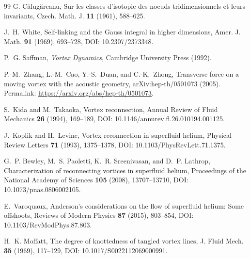 \documentclass[11pt]{article}
\theoremstyle{definition}
\theoremstyle{plain}
\theoremstyle{remark}
\begin{document}
\begin{thebibliography}{99}
            G. C\u{a}lug\u{a}reanu,
            \newblock Sur les classes d'isotopie des noeuds tridimensionnels et leurs invariants,
            \newblock Czech. Math. J. \textbf{11} (1961), 588--625.

            J.~H. White,
            \newblock Self-linking and the Gauss integral in higher dimensions,
            \newblock Amer. J. Math. \textbf{91} (1969), 693--728,
            \newblock DOI: 10.2307/2373348.

            P.~G. Saffman,
            \newblock \emph{Vortex Dynamics},
            \newblock Cambridge University Press (1992).

            P.-M.~Zhang, L.-M.~Cao, Y.-S.~Duan, and C.-K.~Zhong,
            \newblock Transverse force on a moving vortex with the acoustic geometry,
            \newblock arXiv:hep-th/0501073 (2005).
            \newblock Permalink: \url{https://arxiv.org/abs/hep-th/0501073}.


            S.~Kida and M.~Takaoka,
            \newblock Vortex reconnection,
            \newblock Annual Review of Fluid Mechanics \textbf{26} (1994), 169--189,
            \newblock DOI: 10.1146/annurev.fl.26.010194.001125.

            J.~Koplik and H.~Levine,
            \newblock Vortex reconnection in superfluid helium,
            \newblock Physical Review Letters \textbf{71} (1993), 1375--1378,
            \newblock DOI: 10.1103/PhysRevLett.71.1375.

            G.~P. Bewley, M.~S. Paoletti, K.~R. Sreenivasan, and D.~P. Lathrop,
            \newblock Characterization of reconnecting vortices in superfluid helium,
            \newblock Proceedings of the National Academy of Sciences \textbf{105} (2008), 13707--13710,
            \newblock DOI: 10.1073/pnas.0806002105.

            E.~Varoquaux,
            \newblock Anderson's considerations on the flow of superfluid helium: Some offshoots,
            \newblock Reviews of Modern Physics \textbf{87} (2015), 803--854,
            \newblock DOI: 10.1103/RevModPhys.87.803.

            H.~K. Moffatt,
            \newblock The degree of knottedness of tangled vortex lines,
            \newblock J. Fluid Mech. \textbf{35} (1969), 117--129,
            \newblock DOI: 10.1017/S0022112069000991.


\end{thebibliography}
\end{document}
